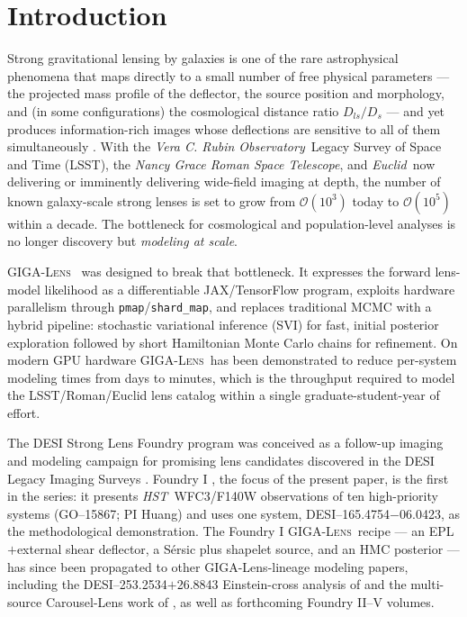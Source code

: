 \documentclass[11pt,letterpaper]{article}
\newcommand{\foundry}{DESI--165.4754$-$06.0423}
\newcommand{\gigalens}{\textsc{GIGA-Lens}}
\begin{document}
\section{Introduction}
\label{sec:intro}

Strong gravitational lensing by galaxies is one of the rare astrophysical
phenomena that maps directly to a small number of free physical
parameters --- the projected mass profile of the deflector, the
source position and morphology, and (in some configurations) the
cosmological distance ratio $D_{ls}/D_{s}$ --- and yet produces
information-rich images whose deflections are sensitive to all of them
simultaneously \citep{refsdal1964,treu2010annurev}. With the
{\it Vera C. Rubin Observatory}\ Legacy Survey of Space and Time (LSST),
the {\it Nancy Grace Roman Space Telescope}, and {\it Euclid}\ now
delivering or imminently delivering wide-field imaging at depth, the
number of known galaxy-scale strong lenses is set to grow from
$\mathcal{O}(10^{3})$ today to $\mathcal{O}(10^{5})$ within a decade.
The bottleneck for cosmological and population-level analyses is no
longer discovery but {\it modeling at scale}.

\gigalens\ \citep{gu2022gigalens} was designed to break that
bottleneck. It expresses the forward lens-model likelihood as a
differentiable JAX/TensorFlow program, exploits hardware parallelism
through \texttt{pmap}/\texttt{shard\_map}, and replaces traditional MCMC
with a hybrid pipeline: stochastic variational inference (SVI) for fast,
initial posterior exploration followed by short Hamiltonian Monte Carlo
chains for refinement. On modern GPU hardware \gigalens\ has been
demonstrated to reduce per-system modeling times from days to minutes,
which is the throughput required to model the LSST/Roman/Euclid lens
catalog within a single graduate-student-year of effort.

The DESI Strong Lens Foundry program was conceived as a follow-up
imaging and modeling campaign for promising lens candidates discovered
in the DESI Legacy Imaging Surveys
\citep{huang2020decals,huang2021desi}. Foundry I
\citep{huang2025foundry1}, the focus of the present paper, is the
first in the series: it presents {\it HST}\ WFC3/F140W observations of
ten high-priority systems (GO--15867; PI Huang) and uses one system,
\foundry, as the methodological demonstration. The Foundry I
\gigalens\ recipe --- an EPL$+$external shear deflector, a S\'{e}rsic
plus shapelet source, and an HMC posterior --- has since been propagated
to other GIGA-Lens-lineage modeling papers, including the
DESI--253.2534$+$26.8843 Einstein-cross analysis of
\citet{cikota2023einsteincross} and the multi-source Carousel-Lens
work of \citet{sheu2024carousel}, as well as forthcoming
Foundry II--V volumes.
\end{document}
